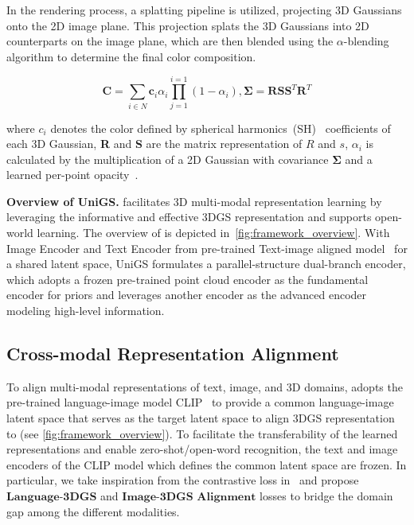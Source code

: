 In the rendering process, a splatting pipeline is utilized, projecting 3D Gaussians onto the 2D image plane. This projection splats the 3D Gaussians into 2D counterparts on the image plane, which are then blended using the $\alpha$-blending algorithm to determine the final color composition.

\begin{equation}
    \label{eq:3dgs4}
    \textbf{C}=\underset{i\in N}{\sum}\textbf{c}_{i}\alpha_i\underset{j=1}{\overset{i=1}{\prod}}(1-\alpha_i), \boldsymbol{\Sigma} = \textbf{R}\textbf{S}\textbf{S}^T\textbf{R}^T
\end{equation}

where $c_i$ denotes the color defined by spherical harmonics~(SH)~\citep{kerbl20233d} coefficients of each 3D Gaussian, \textbf{R} and \textbf{S} are the matrix representation of $R$ and $s$, $\alpha_i$ is calculated by the multiplication of a 2D Gaussian with covariance $\boldsymbol{\Sigma}$ and a learned per-point opacity~\citep{yu2021plenoctrees}.

\label{sec:Overview}
\textbf{Overview of UniGS.} \name{} facilitates 3D multi-modal representation learning by leveraging the informative and effective 3DGS representation and supports open-world learning. The overview of \name{} is depicted in~\cref{fig:framework_overview}. 
%
With Image Encoder and Text Encoder from pre-trained Text-image aligned model~\citep{radford2021learning} for a shared latent space, UniGS formulates a parallel-structure dual-branch encoder, which adopts a frozen pre-trained point cloud encoder as the fundamental encoder for priors and leverages another encoder as the advanced encoder modeling high-level information.

\subsection{Cross-modal Representation Alignment} 
\label{sec:CRA}

To align multi-modal representations of text, image, and 3D domains, \name{} adopts the pre-trained language-image model CLIP~\citep{radford2021learning} to provide a common language-image latent space that serves as the target latent space to align 3DGS representation to (see \cref{fig:framework_overview}). To facilitate the transferability of the learned representations and enable zero-shot/open-word recognition, the text and image encoders of the CLIP model which defines the common latent space are frozen. 
%
In particular, we take inspiration from the contrastive loss in~\citep{radford2021learning, zeng2023clip2} and propose $\textbf{Language-3DGS}$ and $\textbf{Image-3DGS Alignment}$ losses to bridge the domain gap among the different modalities.

